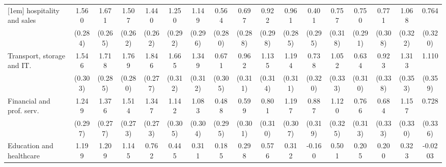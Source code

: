{\begin{tabular}{l*{16}{c}}
[1em]
hospitality and sales&       1.560\sym{***}&       1.671\sym{***}&       1.507\sym{***}&       1.440\sym{***}&       1.250\sym{***}&       1.149\sym{***}&       0.564\sym{*}  &       0.697\sym{*}  &       0.922\sym{**} &       0.961\sym{***}&       0.401         &       0.757\sym{*}  &       0.750\sym{*}  &       0.771\sym{*}  &       1.068\sym{***}&       0.764\sym{*}  \\
                    &     (0.284)         &     (0.265)         &     (0.262)         &     (0.262)         &     (0.292)         &     (0.296)         &     (0.280)         &     (0.288)         &     (0.298)         &     (0.285)         &     (0.295)         &     (0.318)         &     (0.291)         &     (0.308)         &     (0.322)         &     (0.320)         \\
[1em]
Transport, storage and IT.&       1.546\sym{***}&       1.718\sym{***}&       1.769\sym{***}&       1.846\sym{***}&       1.665\sym{***}&       1.349\sym{***}&       0.671\sym{*}  &       0.962\sym{**} &       1.135\sym{***}&       1.194\sym{***}&       0.738\sym{*}  &       1.052\sym{**} &       0.634\sym{*}  &       0.923\sym{**} &       1.313\sym{***}&       1.110\sym{**} \\
                    &     (0.303)         &     (0.285)         &     (0.280)         &     (0.277)         &     (0.312)         &     (0.312)         &     (0.305)         &     (0.311)         &     (0.314)         &     (0.311)         &     (0.320)         &     (0.333)         &     (0.310)         &     (0.338)         &     (0.353)         &     (0.359)         \\
[1em]
Financial and prof. serv.&       1.249\sym{***}&       1.376\sym{***}&       1.514\sym{***}&       1.347\sym{***}&       1.142\sym{***}&       1.083\sym{***}&       0.488         &       0.599\sym{*}  &       0.801\sym{**} &       1.197\sym{***}&       0.887\sym{**} &       1.120\sym{***}&       0.766\sym{*}  &       0.684\sym{*}  &       1.157\sym{***}&       0.728\sym{*}  \\
                    &     (0.297)         &     (0.277)         &     (0.273)         &     (0.273)         &     (0.305)         &     (0.304)         &     (0.295)         &     (0.301)         &     (0.310)         &     (0.307)         &     (0.319)         &     (0.325)         &     (0.313)         &     (0.333)         &     (0.330)         &     (0.336)         \\
[1em]
Education and healthcare&       1.199\sym{***}&       1.209\sym{***}&       1.145\sym{***}&       0.762\sym{*}  &       0.445         &       0.311         &       0.185         &       0.298         &       0.576         &       0.312         &      -0.160         &       0.501         &       0.205         &       0.200         &       0.323         &     -0.0203         \\

\end{tabular}}
